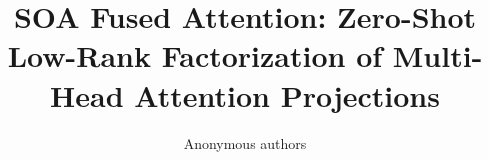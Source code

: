 \title{\textbf{SOA Fused Attention: Zero-Shot Low-Rank Factorization of Multi-Head Attention Projections}}

\author{Anonymous authors}
